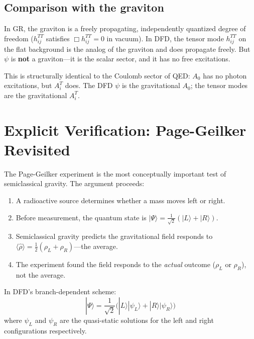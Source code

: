 \documentclass[12pt,a4paper]{article}
\begin{document}
\subsection{Comparison with the graviton}

In GR, the graviton is a freely propagating, independently quantized degree
of freedom ($h_{ij}^{TT}$ satisfies $\Box h_{ij}^{TT} = 0$ in vacuum).
In DFD, the tensor mode $h_{ij}^{TT}$ on the flat background is the analog
of the graviton and does propagate freely. But $\psi$ is \textbf{not} a
graviton---it is the scalar sector, and it has no free excitations.

This is structurally identical to the Coulomb sector of QED: $A_0$ has no
photon excitations, but $A_i^T$ does. The DFD $\psi$ is the gravitational
$A_0$; the tensor modes are the gravitational $A_i^T$.


\section{Explicit Verification: Page-Geilker Revisited}
\label{sec:page-geilker}

The Page-Geilker experiment is the most conceptually important test
of semiclassical gravity. The argument proceeds:

\begin{enumerate}
\item A radioactive source determines whether a mass moves left or right.
\item Before measurement, the quantum state is
$|\Psi\rangle = \frac{1}{\sqrt{2}}(|L\rangle + |R\rangle)$.
\item Semiclassical gravity predicts the gravitational field responds to
$\langle\hat\rho\rangle = \frac{1}{2}(\rho_L + \rho_R)$---the average.
\item The experiment found the field responds to the \emph{actual} outcome
($\rho_L$ or $\rho_R$), not the average.
\end{enumerate}

In DFD's branch-dependent scheme:
\begin{equation}
|\Psi\rangle = \frac{1}{\sqrt{2}}\bigl(|L\rangle|\psi_L\rangle
+ |R\rangle|\psi_R\rangle\bigr)
\end{equation}
where $\psi_L$ and $\psi_R$ are the quasi-static solutions for the
left and right configurations respectively.
\end{document}
